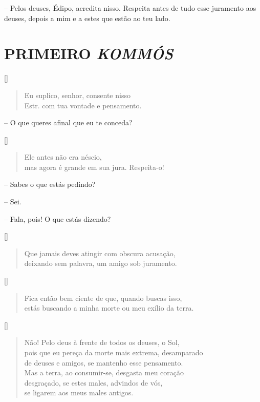  --   Pelos deuses, Édipo, acredita nisso. Respeita antes de tudo esse
juramento aos deuses, depois a mim e a estes que estão ao teu lado.

\section{PRIMEIRO \emph{KOMMÓS}}


\hfill [] 

\begin{verse}Eu suplico, senhor, consente nisso\\ Estr.
com tua vontade e pensamento. 
\end{verse}

 --   O que queres afinal que eu te conceda?


\hfill [] 

\begin{verse}Ele antes não era néscio,\\
mas agora é grande em sua jura. Respeita-o!
\end{verse}

 --   Sabes o que estás pedindo?

 --   Sei.

 --   Fala, pois! O que estás dizendo?


\hfill [] 

\begin{verse}Que jamais deves atingir com obscura acusação,\\
deixando sem palavra, um amigo sob juramento.
\end{verse}

\hfill [] 

\begin{verse}Fica então bem ciente de que, quando buscas isso,\\
estás buscando a minha morte ou meu exílio da terra.
\end{verse}


\hfill [] 

\begin{verse}Não! Pelo deus à frente de todos os deuses, o Sol, \\
pois que eu pereça da morte mais extrema, desamparado\\
de deuses e amigos, se mantenho esse pensamento.\\
Mas a terra, ao consumir-se, desgasta meu coração\\
desgraçado, se estes males, advindos de vós,\\
se ligarem aos meus males antigos.
\end{verse}

